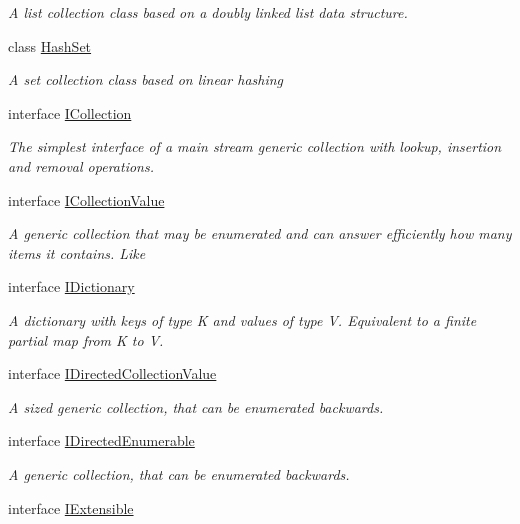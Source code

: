 \begin{DoxyCompactItemize}
\begin{DoxyCompactList}\small\item\em A list collection class based on a doubly linked list data structure. \end{DoxyCompactList}\item 
class \hyperlink{class_c5_1_1_hash_set}{Hash\+Set}
\begin{DoxyCompactList}\small\item\em A set collection class based on linear hashing \end{DoxyCompactList}\item 
interface \hyperlink{interface_c5_1_1_i_collection}{I\+Collection}
\begin{DoxyCompactList}\small\item\em The simplest interface of a main stream generic collection with lookup, insertion and removal operations. \end{DoxyCompactList}\item 
interface \hyperlink{interface_c5_1_1_i_collection_value}{I\+Collection\+Value}
\begin{DoxyCompactList}\small\item\em A generic collection that may be enumerated and can answer efficiently how many items it contains. Like \end{DoxyCompactList}\item 
interface \hyperlink{interface_c5_1_1_i_dictionary}{I\+Dictionary}
\begin{DoxyCompactList}\small\item\em A dictionary with keys of type K and values of type V. Equivalent to a finite partial map from K to V. \end{DoxyCompactList}\item 
interface \hyperlink{interface_c5_1_1_i_directed_collection_value}{I\+Directed\+Collection\+Value}
\begin{DoxyCompactList}\small\item\em A sized generic collection, that can be enumerated backwards. \end{DoxyCompactList}\item 
interface \hyperlink{interface_c5_1_1_i_directed_enumerable}{I\+Directed\+Enumerable}
\begin{DoxyCompactList}\small\item\em A generic collection, that can be enumerated backwards. \end{DoxyCompactList}\item 
interface \hyperlink{interface_c5_1_1_i_extensible}{I\+Extensible}

\end{DoxyCompactItemize}
